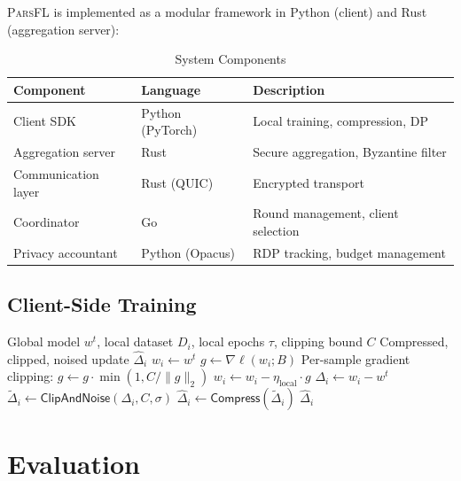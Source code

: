 \documentclass[11pt,a4paper]{article}
\newcommand{\parsfl}{\textsc{ParsFL}\xspace}
\begin{document}
\parsfl is implemented as a modular framework in Python (client) and Rust (aggregation server):

\begin{table}[H]
\centering
\caption{System Components}
\label{tab:system}
\begin{tabular}{lll}
\toprule
\textbf{Component} & \textbf{Language} & \textbf{Description} \\
\midrule
Client SDK & Python (PyTorch) & Local training, compression, DP \\
Aggregation server & Rust & Secure aggregation, Byzantine filter \\
Communication layer & Rust (QUIC) & Encrypted transport \\
Coordinator & Go & Round management, client selection \\
Privacy accountant & Python (Opacus) & RDP tracking, budget management \\
\bottomrule
\end{tabular}
\end{table}

\subsection{Client-Side Training}

\begin{algorithm}[H]
\caption{Client Training Loop}
\label{alg:client}
\begin{algorithmic}[1]
\Require Global model $w^t$, local dataset $D_i$, local epochs $\tau$, clipping bound $C$
\Ensure Compressed, clipped, noised update $\hat{\Delta}_i$
\State $w_i \leftarrow w^t$
        \State $g \leftarrow \nabla \ell(w_i; B)$
        \State Per-sample gradient clipping: $g \leftarrow g \cdot \min(1, C / \|g\|_2)$
        \State $w_i \leftarrow w_i - \eta_{\text{local}} \cdot g$
    \EndFor
\EndFor
\State $\Delta_i \leftarrow w_i - w^t$
\State $\tilde{\Delta}_i \leftarrow \mathsf{ClipAndNoise}(\Delta_i, C, \sigma)$ 
\State $\hat{\Delta}_i \leftarrow \mathsf{Compress}(\tilde{\Delta}_i)$ 
\State \Return $\hat{\Delta}_i$
\end{algorithmic}
\end{algorithm}

\section{Evaluation}
\end{document}
